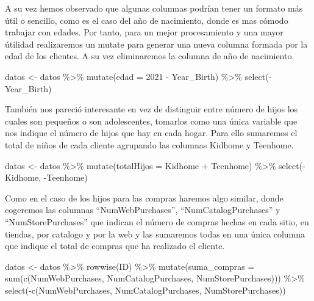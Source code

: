 \documentclass[
]{article}
\newenvironment{Shaded}{\begin{snugshade}}{\end{snugshade}}
\newcommand{\AttributeTok}[1]{\textcolor[rgb]{0.77,0.63,0.00}{#1}}
\newcommand{\DecValTok}[1]{\textcolor[rgb]{0.00,0.00,0.81}{#1}}
\newcommand{\FunctionTok}[1]{\textcolor[rgb]{0.00,0.00,0.00}{#1}}
\newcommand{\NormalTok}[1]{#1}
\newcommand{\OtherTok}[1]{\textcolor[rgb]{0.56,0.35,0.01}{#1}}
\newcommand{\SpecialCharTok}[1]{\textcolor[rgb]{0.00,0.00,0.00}{#1}}
\begin{document}
A su vez hemos observado que algunas columnas podrían tener un formato
más útil o sencillo, como es el caso del año de nacimiento, donde es mas
cómodo trabajar con edades. Por tanto, para un mejor procesamiento y una
mayor útilidad realizaremos un mutate para generar una nueva columna
formada por la edad de los clientes. A su vez eliminaremos la columna de
año de nacimiento.

\begin{Shaded}
\begin{Highlighting}[]
\NormalTok{datos }\OtherTok{\textless{}{-}}\NormalTok{ datos }\SpecialCharTok{\%\textgreater{}\%}
  \FunctionTok{mutate}\NormalTok{(}\AttributeTok{edad =} \DecValTok{2021} \SpecialCharTok{{-}}\NormalTok{ Year\_Birth) }\SpecialCharTok{\%\textgreater{}\%}
  \FunctionTok{select}\NormalTok{(}\SpecialCharTok{{-}}\NormalTok{Year\_Birth) }
\end{Highlighting}
\end{Shaded}

También nos pareció interesante en vez de distinguir entre número de
hijos los cuales son pequeños o son adolescentes, tomarlos como una
única variable que nos indique el número de hijos que hay en cada hogar.
Para ello sumaremos el total de niños de cada cliente agrupando las
columnas Kidhome y Teenhome.

\begin{Shaded}
\begin{Highlighting}[]
\NormalTok{datos }\OtherTok{\textless{}{-}}\NormalTok{ datos }\SpecialCharTok{\%\textgreater{}\%}
  \FunctionTok{mutate}\NormalTok{(}\AttributeTok{totalHijos =}\NormalTok{ Kidhome }\SpecialCharTok{+}\NormalTok{ Teenhome) }\SpecialCharTok{\%\textgreater{}\%}
  \FunctionTok{select}\NormalTok{(}\SpecialCharTok{{-}}\NormalTok{Kidhome, }\SpecialCharTok{{-}}\NormalTok{Teenhome)}
\end{Highlighting}
\end{Shaded}

Como en el caso de los hijos para las compras haremos algo similar,
donde cogeremos las columnas ``NumWebPurchases'',
``NumCatalogPurchases'' y ``NumStorePurchases'' que indican el número de
compras hechas en cada sitio, en tiendas, por catalogo y por la web y
las sumaremos todas en una única columna que indique el total de compras
que ha realizado el cliente.

\begin{Shaded}
\begin{Highlighting}[]
\NormalTok{datos }\OtherTok{\textless{}{-}}\NormalTok{ datos }\SpecialCharTok{\%\textgreater{}\%}
  \FunctionTok{rowwise}\NormalTok{(ID) }\SpecialCharTok{\%\textgreater{}\%}
  \FunctionTok{mutate}\NormalTok{(}\AttributeTok{suma\_compras =} \FunctionTok{sum}\NormalTok{(}\FunctionTok{c}\NormalTok{(NumWebPurchases, NumCatalogPurchases, }
\NormalTok{                              NumStorePurchases))) }\SpecialCharTok{\%\textgreater{}\%}
  \FunctionTok{select}\NormalTok{(}\SpecialCharTok{{-}}\FunctionTok{c}\NormalTok{(NumWebPurchases, NumCatalogPurchases, NumStorePurchases))}
\end{Highlighting}
\end{Shaded}
\end{document}
